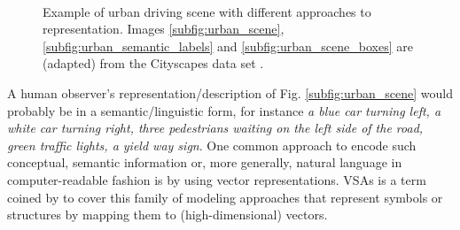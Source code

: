 \begin{figure}[t!]
	\centering
	\\
	\caption{Example of urban driving scene with different approaches to representation. Images \ref{subfig:urban_scene}, \ref{subfig:urban_semantic_labels} and \ref{subfig:urban_scene_boxes} are (adapted) from the Cityscapes data set \citep{Cordts2016}.}
    \label{fig:urban_scene}
\end{figure}
A human observer's representation/description of Fig. \ref{subfig:urban_scene} would probably be in a semantic/linguistic form, for instance \emph{a blue car turning left, a white car turning right, three pedestrians waiting on the left side of the road, green traffic lights, a yield way sign}.
One common approach to encode such conceptual, semantic information or, more generally, natural language in computer-readable fashion is by using vector representations.
\acfp{VSA} is a term coined by \citet{Gayler2003} to cover this family of modeling approaches that represent symbols or structures by mapping them to (high-dimensional) vectors.

